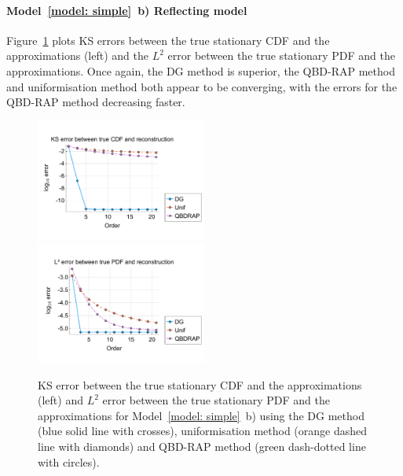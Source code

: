 \paragraph{Model~\ref{model: simple}~b) Reflecting model}
Figure~\ref{fig: reflecting stationary} plots KS errors between the true stationary CDF and the approximations (left) and the \(L^2\) error between the true stationary PDF and the approximations. Once again, the DG method is superior, the QBD-RAP method and uniformisation method both appear to be converging, with the errors for the QBD-RAP method decreasing faster.
\begin{figure}
	\centering
	\includegraphics[width=0.5\textwidth,trim={0.75cm 0.8cm 0.25cm 1.25cm},clip]{chapter6/figs/hitting_times_model/reflecting_model/stationary_distribution/ks_error_formatted.pdf}%
	\includegraphics[width=0.5\textwidth,trim={0.75cm 0.8cm 0.25cm 1.25cm},clip]{chapter6/figs/hitting_times_model/reflecting_model/stationary_distribution/l2_pdf_error_formatted.pdf}
	\caption{KS error between the true stationary CDF and the approximations (left) and \(L^2\) error between the true stationary PDF and the approximations for Model~\ref{model: simple}~b) using the DG method (blue solid line with crosses), uniformisation method (orange dashed line with diamonds) and QBD-RAP method (green dash-dotted line with circles).} 
	\label{fig: reflecting stationary} 
\end{figure}

